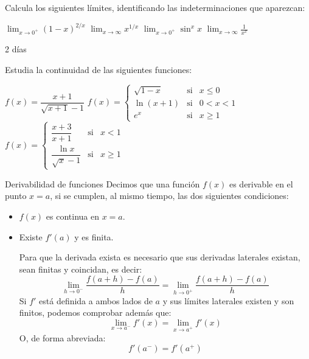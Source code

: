 \begin{ejemplo}{
    Calcula los siguientes límites, identificando las indeterminaciones que aparezcan:
    \begin{apartadosc}
        \ap $\displaystyle{
                \lim_{x\to0^+}(1-x)^{2/x}
            }$
        \ap $\displaystyle{
                \lim_{x\to\infty}x^{1/x}
            }$
        \ap $\displaystyle{
                \lim_{x\to0^+}\sin^x{x}
            }$
        \ap $\displaystyle{
                \lim_{x\to\infty}\frac1{x^x}
            }$
    \end{apartadosc}
}
\end{ejemplo}

\begin{definicion}{2 días}

\end{definicion}

\begin{ejemplo}{Estudia la continuidad de las siguientes funciones:
\begin{apartados}
 \ap $f(x)=\dfrac{x+1}{\sqrt{x+1}-1}$
 \ap $f(x)=
    \left\{\begin{array}{lcc}
        \sqrt{1-x}&\text{si}&x\leqslant0\\[5pt]
        \ln{(x+1)}&\text{si}&0<x<1\\[5pt]
        e^x&\text{si}&x\geqslant1
    \end{array}\right.$
 \ap $f(x)=
    \left\{\begin{array}{ccc}
        \dfrac{x+3}{x+1}&\text{si}&x<1\\[10pt]
        \dfrac{\ln{x}}{\sqrt{x}-1}&\text{si}&x\geqslant1
    \end{array}\right.$
\end{apartados}}

\end{ejemplo}

\begin{definicion}{Derivabilidad de funciones}
Decimos que una función $f(x)$ es derivable en el punto $x=a$, si se cumplen, al mismo tiempo, las dos siguientes condiciones:
\begin{itemize}
 \item $f(x)$ es continua en $x=a$.
 \item Existe $f'(a)$ y es finita.
 
 Para que la derivada exista es necesario que sus derivadas laterales existan, sean finitas y coincidan, es decir:
 \[
    \lim_{h\to0^-}\frac{f(a+h)-f(a)}{h}=
    \lim_{h\to0^+}\frac{f(a+h)-f(a)}{h}
\]
Si $f'$ está definida a ambos lados de $a$ y sus límites laterales existen y son finitos, podemos comprobar además que:
\[
    \lim_{x\to a^-}f'(x)=\lim_{x\to a^+}f'(x)
 \]
 O, de forma abreviada:
 \[f'(a^-)=f'(a^+)\]
\end{itemize}
\end{definicion}

